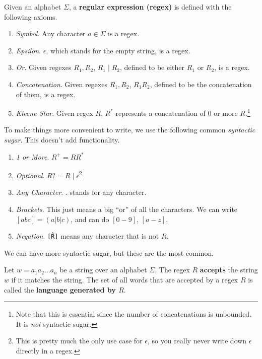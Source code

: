   \begin{definition}
    Given an alphabet $\Sigma$, a \textbf{regular expression (regex)} is defined with the following axioms. 
    \begin{enumerate}
      \item \textit{Symbol}. Any character $a \in \Sigma$ is a regex. 
      \item \textit{Epsilon}. $\epsilon$, which stands for the empty string, is a regex. 
      \item \textit{Or}. Given regexes $R_1, R_2$, $R_1 \mid R_2$, defined to be either $R_1$ or $R_2$, is a regex. 
      \item \textit{Concatenation}. Given regexes $R_1, R_2$, $R_1 R_2$, defined to be the concatenation of them, is a regex. 
      \item \textit{Kleene Star}. Given regex $R$, $R^\ast$ represents a concatenation of 0 or more $R$.\footnote{Note that this is essential since the number of concatenations is unbounded. It is \textit{not} syntactic sugar.}
    \end{enumerate}
  \end{definition}

  To make things more convenient to write, we use the following common \textit{syntactic sugar}. This doesn't add functionality.  
  \begin{enumerate}
    \item \textit{1 or More}. $R^+ = R R^\ast$ 
    \item \textit{Optional}. $R? = R \mid \epsilon$\footnote{This is pretty much the only use case for $\epsilon$, so you really never write down $\epsilon$ directly in a regex. }
    \item \textit{Any Character}. $.$ stands for any character. 
    \item \textit{Brackets}. This just means a big ``or'' of all the characters. We can write $[abc] = (a | b | c)$, and can do $[0-9]$, $[a-z]$. 
    \item \textit{Negation}. \texttt{[\^ R]} means any character that is not $R$. 
  \end{enumerate}
  We can have more syntactic sugar, but these are the most common. 

  \begin{definition}
    Let $w = a_1 a_2 \ldots a_n$ be a string over an alphabet $\Sigma$. The regex $R$ \textbf{accepts} the string $w$ if it matches the string. The set of all words that are accepted by a regex $R$ is called the \textbf{language generated by $R$}. 
  \end{definition}

